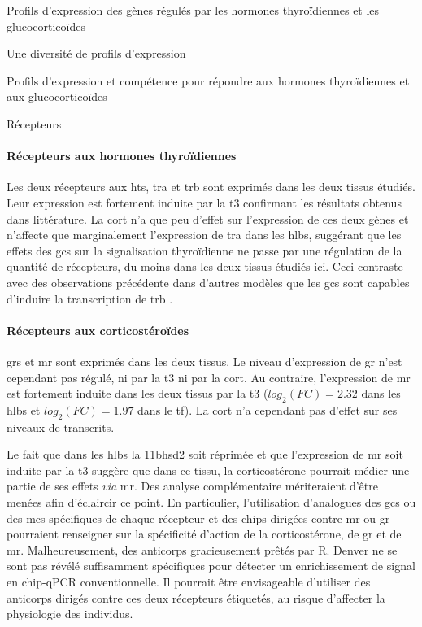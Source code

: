 \documentclass[../main.tex]{subfiles}
\begin{document}
\begin{chapter}{Profils d'expression des gènes régulés par les hormones thyroïdiennes et les glucocorticoïdes}
\begin{section}{Une diversité de profils d'expression}
\begin{subsection}{Profils d'expression et compétence pour répondre aux hormones thyroïdiennes et aux glucocorticoïdes}
\begin{subsubsection}{Récepteurs}
\paragraph{Récepteurs aux hormones thyroïdiennes}
Les deux récepteurs aux \glspl{ht}, \gls{tra} et \gls{trb} sont exprimés dans les deux tissus étudiés.
Leur expression est fortement induite par la \gls{t3} confirmant les résultats obtenus dans littérature.
La \gls{cort} n'a que peu d'effet sur l'expression de ces deux gènes et n'affecte que marginalement l'expression de \gls{tra} dans les \glspl{hlb}, suggérant que les effets des \glspl{gc} sur la signalisation thyroïdienne ne passe par une régulation de la quantité de récepteurs, du moins dans les deux tissus étudiés ici.
Ceci contraste avec des observations précédente dans d'autres modèles que les \glspl{gc} sont capables d'induire la transcription de \gls{trb} \citep{Montesinos2006}.

\paragraph{Récepteurs aux corticostéroïdes}
\glspl{gr} et \gls{mr} sont exprimés dans les deux tissus.
Le niveau d'expression de \gls{gr} n'est cependant pas régulé, ni par la \gls{t3} ni par la \gls{cort}.
Au contraire, l'expression de \gls{mr} est fortement induite dans les deux tissus par la \gls{t3} ($log_2(FC)=2.32$ dans les \glspl{hlb} et $log_2(FC)=1.97$ dans le \gls{tf}).
La \gls{cort} n'a cependant pas d'effet sur ses niveaux de transcrits.
\par
Le fait que dans les \glspl{hlb} la \gls{11bhsd2} soit réprimée et que l'expression de \gls{mr} soit induite par la \gls{t3} suggère que dans ce tissu, la corticostérone pourrait médier une partie de ses effets \textit{via} \gls{mr}.
Des analyse complémentaire mériteraient d'être menées afin d'éclaircir ce point.
En particulier, l'utilisation d'analogues des \glspl{gc} ou des \glspl{mc} spécifiques de chaque récepteur et des \glspl{chip} dirigées contre \gls{mr} ou \gls{gr} pourraient renseigner sur la spécificité d'action de la corticostérone, de \gls{gr} et de \gls{mr}.
Malheureusement, des anticorps gracieusement prêtés par R. Denver ne se sont pas révélé suffisamment spécifiques pour détecter un enrichissement de signal en \gls{chip}-qPCR conventionnelle.
Il pourrait être envisageable d'utiliser des anticorps dirigés contre ces deux récepteurs étiquetés, au risque d'affecter la physiologie des individus.
\end{subsubsection}


\end{subsection}
\end{section}
\end{chapter}
\end{document}
